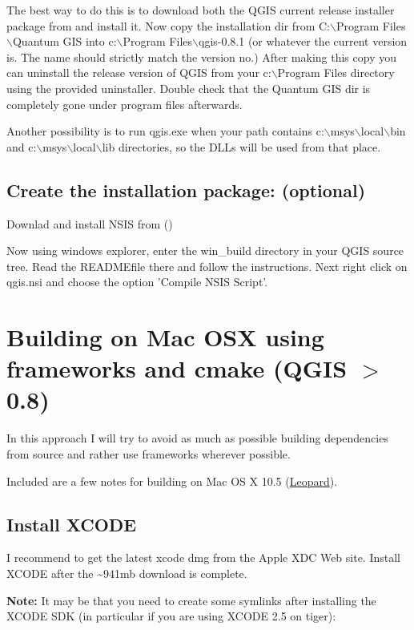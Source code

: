 The best way to do this is to download both the QGIS current release installer
package from  and install it. Now copy
the installation dir from C:$\backslash$Program Files$\backslash$Quantum GIS into c:$\backslash$Program
Files$\backslash$qgis-0.8.1 (or whatever the current version is. The name should strictly
match the version no.) After making this copy you can uninstall the release
version of QGIS from your c:$\backslash$Program Files directory using the provided
uninstaller. Double check that the Quantum GIS dir is completely gone under
program files afterwards.

Another possibility is to run qgis.exe when your path contains
c:$\backslash$msys$\backslash$local$\backslash$bin and c:$\backslash$msys$\backslash$local$\backslash$lib directories, so the DLLs will be
used from that place.

\subsection{Create the installation package: (optional)}
Downlad and install NSIS from ()

Now using windows explorer, enter the win\_build directory in your QGIS source
tree. Read the READMEfile there and follow the instructions. Next right click
on qgis.nsi and choose the option 'Compile NSIS Script'. 


\section{Building on Mac OSX using frameworks and cmake (QGIS $>$ 0.8)}\label{sec:install_macosx}
In this approach I will try to avoid as much as possible building dependencies
from source and rather use frameworks wherever possible.

Included are a few notes for building on Mac OS X 10.5 (\underline{Leopard}).

\subsection{Install XCODE}
I recommend to get the latest xcode dmg from the Apple XDC Web site. Install
XCODE after the \~{}941mb download is complete.

\textbf{Note:} It may be that you need to create some symlinks after installing 
the XCODE SDK (in particular if you are using XCODE 2.5 on tiger):


